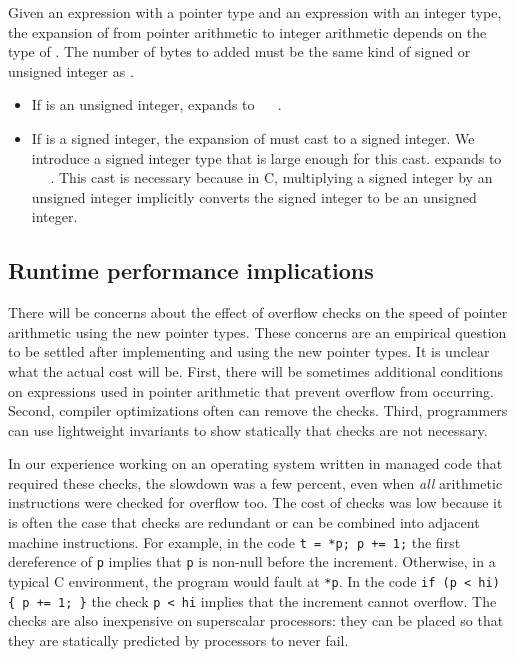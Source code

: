 Given an expression  with a pointer type and an expression
 with an integer type, the expansion of  from
pointer arithmetic to integer arithmetic depends on the type of
. The number of bytes to added must be the same kind of
signed or unsigned integer as .

\begin{itemize}
\item
  If  is an unsigned integer,  expands to
   \plusovf\  \mulovf\ .
\item
  If  is a signed integer, the expansion of 
  must cast  to a signed integer. We introduce a
  signed integer type  that is large enough for
  this cast.  expands to  \plusovf\
   \code{)} \mulovf\ . This cast is
  necessary because in C, multiplying a signed integer by an unsigned
  integer implicitly converts the signed integer to be an unsigned
  integer.
\end{itemize}

\subsection{Runtime performance implications}

There will be concerns about the effect of overflow checks on the speed
of pointer arithmetic using the new pointer types. These concerns are an
empirical question to be settled after implementing and using the new
pointer types. It is unclear what the actual cost will be. First, there
will be sometimes additional conditions on expressions used in
pointer arithmetic that prevent overflow from occurring. Second,
compiler optimizations often can remove the checks. Third, programmers
can use lightweight invariants to show statically that checks are not
necessary.

In our experience working on an operating system written in managed code
that required these checks, the slowdown was a few percent, even when
\emph{all} arithmetic instructions were checked for overflow too. The
cost of checks was low because it is often the case that checks are
redundant or can be combined into adjacent machine instructions. For
example, in the code \lstinline|t = *p; p += 1;| the first dereference of
\lstinline+p+ implies that \lstinline+p+ is non-null before the increment.
Otherwise, in a typical C environment, the program would fault at
\lstinline+*p+. In the code \lstinline|if (p < hi) { p += 1; }|
the check \lstinline+p < hi+ implies that the increment cannot
overflow. The checks are also inexpensive on superscalar processors:
they can be placed so that they are statically predicted by
processors to never fail.

